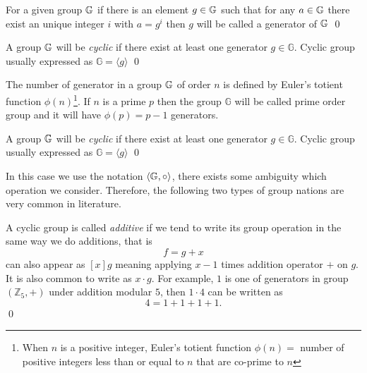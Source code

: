\begin{definition}
	For a given group $\mathbb{G}\index{group}$ if there is an element $g\in\mathbb{G}\index{group}$ such that for any $a\in\mathbb{G}\index{group}$ there exist an unique integer $i$ with $a=g^{i}$ then $g$ will be called a   generator of  $\mathbb{G}\index{group}$
\qed
\end{definition}

\begin{definition}
A group $\mathbb{G}\index{group}$ will be {\em cyclic} if there exist at least one generator $g \in \mathbb{G}$. Cyclic group usually expressed as $\mathbb{G} = \langle g \rangle$
 \qed 
\end{definition}

\begin{remark}
	The number of generator in a group $\mathbb{G}\index{group}$ of order $n$ is defined by Euler's totient function $\phi(n)$\footnote{When $n$ is a positive integer, Euler's totient function $\phi(n)=$ number of positive integers less than or equal to $n$ that are co-prime to $n$}.
	If $n$ is a prime $p$ then the  group $\mathbb{G}$ will be called prime order group and it will have $\phi(p) = p-1$ generators.
\end{remark}

\begin{definition}
	A group $\mathbb{G}\index{group}$ will be {\em cyclic} if there exist at least one generator $g \in \mathbb{G}$. Cyclic group usually expressed as $\mathbb{G} = \langle g \rangle$ 
	\qed 
\end{definition}

In this case we use the notation $\langle\mathbb{G}\index{group},\circ\rangle$,  there exists some ambiguity which operation we consider.
Therefore, the following two types of group nations are very common in literature.

\begin{definition}
A cyclic group is called \textit{additive} if we tend to write its group operation in the same way we do additions, that is 
$$f = g + x$$ 
can also appear as $[x]g$ meaning applying $x -1$ times addition operator $+$ on $g$.
It is also common to write as $x \cdot g$.
For example, $1$ is one of generators in group $(\mathbb{Z}_5, + )$ under addition modular $5$, then $1 \cdot 4$ can be written as $$ 4 = 1+ 1+ 1+1.$$
\qed
 \end{definition}

